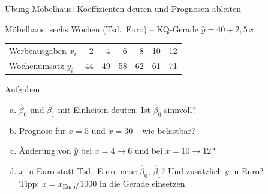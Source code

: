 \documentclass[aspectratio=169,11pt]{beamer}
\begin{document}
\begin{frame}{Übung Möbelhaus: Koeffizienten deuten und Prognosen ableiten}
  \begin{block}{Möbelhaus, sechs Wochen (Tsd.~Euro) -- KQ-Gerade $\hat{y} = 40 + 2{,}5\,x$}
    \begin{center}
      \renewcommand{\arraystretch}{1.05}
      \begin{tabular}{l*{6}{r}}
        \toprule
        Werbeausgaben $x_i$ & 2  & 4  & 6  & 8  & 10 & 12 \\
        Wochenumsatz $y_i$  & 44 & 49 & 58 & 62 & 61 & 71 \\
        \bottomrule
      \end{tabular}
    \end{center}
  \end{block}

  \medskip

  \begin{exampleblock}{Aufgaben}
    \begin{enumerate}[a)]
      \setlength{\itemsep}{2pt}
      \item $\hat{\beta}_0$ und $\hat{\beta}_1$ mit Einheiten deuten. Ist $\hat{\beta}_0$ sinnvoll?
      \item Prognose für $x = 5$ und $x = 30$ -- wie belastbar?
      \item Änderung von $\hat{y}$ bei $x = 4 \to 6$ und bei $x = 10 \to 12$?
      \item $x$ in Euro statt Tsd.~Euro: neue $\hat{\beta}_0$, $\hat{\beta}_1$? Und zusätzlich $y$ in Euro?\\
            {\footnotesize Tipp: $x = x_{\text{Euro}} / 1000$ in die Gerade einsetzen.}
    \end{enumerate}
  \end{exampleblock}
\end{frame}
\end{document}
